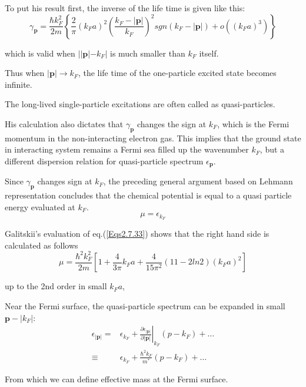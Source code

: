 To put his result first, the inverse of the life time is given like this:
\begin{equation} \label{Eqs2.7.34}
\gamma_{\mathbf{p}} = \frac{\hbar k_F^2}{2m}\left\{ \frac{2}{\pi} (k_F a)^2 \left(\frac{k_F - |\mathbf{p}|}{k_F}\right)^2 sgn(k_F-|\mathbf{p}|) + o((k_F a)^3) \right\}
\end{equation}

which is valid when $||\mathbf{p}|-k_F|$ is much smaller than $k_F$ itself.

Thus when $|\mathbf{p}|\rightarrow k_F$, the life time of the one-particle excited state becomes infinite.

The long-lived single-particle excitations are often called as quasi-particles.

His calculation also dictates that $\gamma_\mathbf{p}$ changes the sign at $k_F$, which is the Fermi momentum in the non-interacting electron gas. This implies that the ground state in interacting system remains a Fermi sea filled up the wavenumber $k_F$, but a different dispersion relation for quasi-particle spectrum $\epsilon_{\mathbf{p}}$.

Since $\gamma_{\mathbf{p}}$ changes sign at $k_F$, the preceding general argument based on Lehmann representation concludes that the chemical potential is equal to a quasi particle energy evaluated at $k_F$.
\[ \mu=\epsilon_{k_F} \]

Galitskii's evaluation of eq.(\ref{Eqs2.7.33}) shows that the right hand side is calculated as follows
\begin{equation} \label{Eqs2.7.35}
\mu = \frac{\hbar^2 k_F^2}{2m}\left[ 1+\frac{4}{3\pi}k_F a + \frac{4}{15\pi^2}(11-2 ln2)(k_F a)^2 \right]
\end{equation}

up to the 2nd order in small $k_F a$,

Near the Fermi surface, the quasi-particle spectrum can be expanded in small $\mathbf{p}-|k_F|$:
\begin{equation} \label{Eqs2.7.36} \begin{split}
\epsilon_{|\mathbf{p}|} =& \epsilon_{k_F} + \left. \frac{\partial \epsilon_{|\mathbf{p}|}}{\partial |\mathbf{p}|} \right|_{k_F} (p-k_F) + \ldots\\
\equiv& \epsilon_{k_F} + \frac{\hbar^2 k_F}{m^{*}} (p-k_F) + \ldots
\end{split} \end{equation}

From which we can define effective mass at the Fermi surface.

